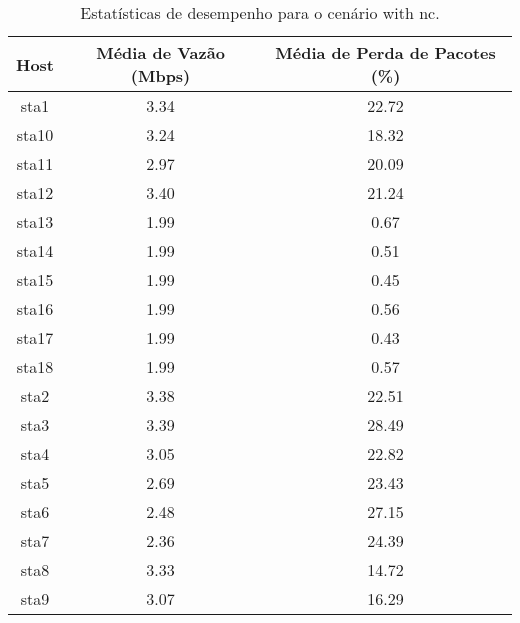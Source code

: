 \begin{table}[htbp]
    \centering
    \label{tab:with_nc_stats}
    \begin{tabular}{|c|c|c|}
        \hline
        \textbf{Host} & \textbf{Média de Vazão (Mbps)} & \textbf{Média de Perda de Pacotes (\%)} \\ \hline
        sta1 & 3.34 & 22.72 \\ \hline
        sta10 & 3.24 & 18.32 \\ \hline
        sta11 & 2.97 & 20.09 \\ \hline
        sta12 & 3.40 & 21.24 \\ \hline
        sta13 & 1.99 & 0.67 \\ \hline
        sta14 & 1.99 & 0.51 \\ \hline
        sta15 & 1.99 & 0.45 \\ \hline
        sta16 & 1.99 & 0.56 \\ \hline
        sta17 & 1.99 & 0.43 \\ \hline
        sta18 & 1.99 & 0.57 \\ \hline
        sta2 & 3.38 & 22.51 \\ \hline
        sta3 & 3.39 & 28.49 \\ \hline
        sta4 & 3.05 & 22.82 \\ \hline
        sta5 & 2.69 & 23.43 \\ \hline
        sta6 & 2.48 & 27.15 \\ \hline
        sta7 & 2.36 & 24.39 \\ \hline
        sta8 & 3.33 & 14.72 \\ \hline
        sta9 & 3.07 & 16.29 \\ \hline
    \end{tabular}
    \caption{Estatísticas de desempenho para o cenário with nc.}
\end{table}

